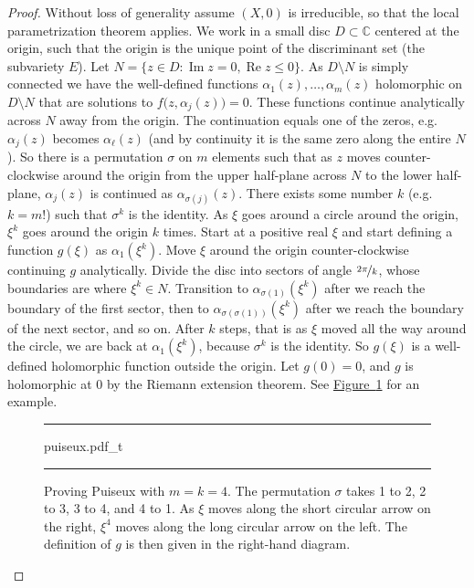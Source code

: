 \documentclass[12pt,openany]{book}
\renewcommand{\Re}{\operatorname{Re}}
\renewcommand{\Im}{\operatorname{Im}}
\newcommand{\C}{{\mathbb{C}}}
\theoremstyle{plain}
\theoremstyle{remark}
\theoremstyle{definition}
\newenvironment{myfig}{%
\begin{figure}[h!t]
\noindent\rule{\textwidth}{0.5pt}\vspace{12pt}\par\centering}%
{\par\noindent\rule{\textwidth}{0.5pt}
\end{figure}}
\theoremstyle{exercise}
\theoremstyle{example}
\newcommand{\figureref}[1]{\hyperref[#1]{Figure~\ref*{#1}}}
\begin{document}
\begin{proof}
Without loss of generality
assume $(X,0)$
is irreducible, so that
the local parametrization theorem applies.
We work in a small disc $D \subset \C$ centered at the origin, such that the
origin is the unique point of the discriminant set (the subvariety
$E$).  Let $N = \{ z \in D : \Im z = 0 , \Re z \leq 0 \}$.
As $D \setminus N$ is simply connected we have the well-defined functions
$\alpha_1(z),\ldots,\alpha_m(z)$ holomorphic on $D \setminus N$
that are solutions to $f\bigl(z,\alpha_j(z)\bigr) = 0$.
These functions continue analytically across $N$ away from the
origin.  The continuation equals one of the zeros, e.g.\ $\alpha_j(z)$
becomes $\alpha_\ell(z)$ (and by continuity it is the
same zero along the entire $N$).  So there is
a permutation $\sigma$ on $m$ elements such that as $z$ moves
counter-clockwise around the origin from the upper half-plane across $N$ to the
lower half-plane,
$\alpha_j(z)$ is continued as $\alpha_{\sigma(j)}(z)$.
There exists some number $k$ (e.g.\ $k=m!$) such that $\sigma^k$ is the identity.
As $\xi$ goes around
a circle around the origin, $\xi^k$ goes around the origin $k$ times.
Start at a positive real $\xi$ and start defining a
function $g(\xi)$ as
$\alpha_1(\xi^k)$.
Move $\xi$ around the origin counter-clockwise continuing $g$ analytically.
Divide the disc into sectors of angle $\nicefrac{2\pi}{k}$,
whose boundaries are where $\xi^k \in N$.
Transition to $\alpha_{\sigma(1)}(\xi^k)$ after we reach the boundary
of the first sector, then to
$\alpha_{\sigma(\sigma(1))}(\xi^k)$ after we reach the boundary of the next sector, and so on.
After $k$ steps, that is as
$\xi$ moved all the way around the circle,
we are back at $\alpha_1(\xi^k)$,
because
$\sigma^k$ is the identity.
So $g(\xi)$ is a well-defined holomorphic function outside the origin.  Let
$g(0) = 0$, and $g$ is holomorphic at 0 by the Riemann extension theorem.
See \figureref{fig:puiseux} for an example.
\begin{myfig}
{puiseux.pdf_t}
\caption{Proving Puiseux with $m = k = 4$.  The permutation $\sigma$ takes 1 to 2, 2 to 3, 3 to 4,
and 4 to 1.  As $\xi$ moves along the short circular arrow on the right, $\xi^4$
moves along the long circular arrow on the left.  The definition of $g$ is
then given in the right-hand diagram.\label{fig:puiseux}}
\end{myfig}
\end{proof}
\end{document}
